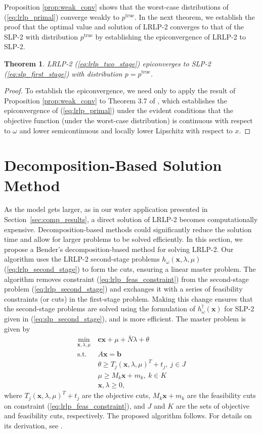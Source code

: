 \documentclass[11pt]{article}
\newcommand{\x}{\mathbf{x}}
\renewcommand{\c}{\mathbf{c}}
\renewcommand{\b}{\mathbf{b}}
\newcommand{\ptrue}{p^{\text{true}}}
\newtheorem{theorem}{Theorem}
\newcommand{\st}{\mbox{s.t.}}
\begin{document}
Proposition \ref{prop:weak_conv} shows that the worst-case distributions of (\ref{eq:lrlp_primal}) converge weakly to $\ptrue$.
In the next theorem, we establish the proof that the optimal value and solution of LRLP-2 converges to that of the SLP-2 with distribution $\ptrue$ by establishing the epiconvergence of LRLP-2 to SLP-2.
\begin{theorem}
	LRLP-2 (\ref{eq:lrlp_two_stage}) epiconverges to SLP-2 (\ref{eq:slp_first_stage}) with distribution $p = \ptrue$.
\end{theorem}

\begin{proof}
	To establish the epiconvergence, we need only to apply the result of Proposition \ref{prop:weak_conv} to Theorem 3.7 of \cite{dupacova1988asymptotic}, which establishes the epiconvergence of (\ref{eq:lrlp_primal}) under the evident conditions that the objective function (under the worst-case distribution) is continuous with respect to $\omega$ and lower semicontinuous and locally lower Lipschitz with respect to $x$.
\end{proof}

\section{Decomposition-Based Solution Method} \label{sec:soln_algorithm}

As the model gets larger, as in our water application presented in Section~\ref{sec:comp_results}, a direct solution of LRLP-2 becomes computationally expensive. 
Decomposition-based methods could significantly reduce the solution time and allow for larger problems to be solved efficiently. In this section, we propose a Bender's decomposition-based method for solving LRLP-2.
Our algorithm uses the LRLP-2 second-stage problems $h_\omega(\x,\lambda,\mu)$ (\ref{eq:lrlp_second_stage}) to form the cuts, ensuring a linear master problem.
The algorithm removes constraint (\ref{eq:lrlp_feas_constraint}) from the second-stage problem (\ref{eq:lrlp_second_stage}) and exchanges it with a series of feasibility constraints (or cuts) in the first-stage problem.
Making this change ensures that the second-stage problems are solved using the formulation of $h^\dagger_\omega(\x)$ for SLP-2 given in  (\ref{eq:slp_second_stage}), and is more efficient.
The master problem is given by
\begin{align}
	\min_{\x,\lambda,\mu} \ & \c\x + \mu + \bar{N}\lambda + \theta \label{eq:master_problem}\\
	\st \ & A\x = \b \nonumber \\
	& \theta \geq T_j (\x,\lambda,\mu)^T + t_j, \ j \in J \nonumber \\
	& \mu \geq M_k \x + m_k, \ k \in K \nonumber \\
	& \x,\lambda \geq 0, \nonumber
\end{align}
where $T_j (\x,\lambda,\mu)^T + t_j$ are the objective cuts, $M_k \x + m_k$ are the feasibility cuts on constraint (\ref{eq:lrlp_feas_constraint}), and $J$ and $K$ are the sets of objective and feasibility cuts, respectively.
The proposed algorithm follows.
For details on its derivation, see \cite{love2013likelihood}.
\end{document}
